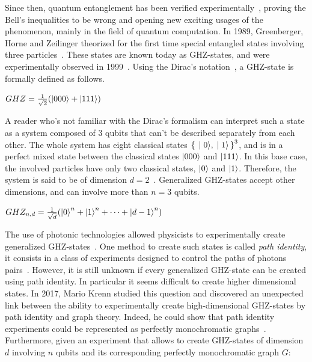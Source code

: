 Since then, quantum entanglement has been verified experimentally~\cite{2012QuantumTA}, proving the Bell's inequalities to be wrong and opening new exciting usages of the phenomenon, mainly in the field of quantum computation.
In 1989, Greenberger, Horne and Zeilinger theorized for the first time special entangled states involving three particles~\cite{GHZ}.
These states are known today as GHZ-states, and were experimentally observed in 1999~\cite{Bouwmeester_1999}.
Using the Dirac's notation~\cite{dirac1939}, a GHZ-state is formally defined as follows. \\

\begin{center}
    $GHZ = \frac{1}{\sqrt{2}}(\ket{000} + \ket{111})$
\end{center}

A reader who's not familiar with the Dirac's formalism can interpret such a state as a system composed of 3 qubits that can't be described separately from each other.
The whole system has eight classical states $\set{\ket{0}, \ket{1}}^3$, and is in a perfect mixed state between the classical states $\ket{000}$ and $\ket{111}$.
In this base case, the involved particles have only two classical states, $\ket{0}$ and $\ket{1}$.
Therefore, the system is said to be of dimension $d = 2$~\cite{Krenn_2017}.
Generalized GHZ-states accept other dimensions, and can involve more than $n = 3$ qubits.

\begin{center}
    $GHZ_{n, d} = \frac{1}{\sqrt{d}}(\ket{0}^n + \ket{1}^n + \dots + \ket{d-1}^n)$
\end{center}

The use of photonic technologies allowed physicists to experimentally create generalized GHZ-states~\cite{wang2016experimental}.
One method to create such states is called \textit{path identity}, it consists in a class of experiments designed to control the paths of photons pairs~\cite{PathIdentity}.
However, it is still unknown if every generalized GHZ-state can be created using path identity.
In particular it seems difficult to create higher dimensional states.
In 2017, Mario Krenn studied this question and discovered an unexpected link between the ability to experimentally create high-dimensional GHZ-states by path identity and graph theory.
Indeed, he could show that path identity experiments could be represented as perfectly monochromatic graphs~\cite{Krenn_2017}.
Furthermore, given an experiment that allows to create GHZ-states of dimension $d$ involving $n$ qubits and its corresponding perfectly monochromatic graph $G$:

